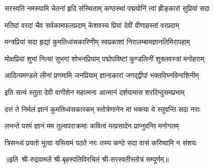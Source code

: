 
\twolineshloka
{सरस्वति नमस्यामि चेतनां हृदि संस्थिताम्}
{कण्ठस्थां पद्मयोनिं त्वां ह्रीङ्कारां सुप्रियां सदा}

\twolineshloka
{मतिदां वरदां चैव सर्वकामफलप्रदाम्}
{केशवस्य प्रियां देवीं वीणाहस्तां वरप्रदाम्}

\twolineshloka
{मन्त्रप्रियां सदा हृद्यां कुमतिध्वंसकारिणीम्}
{स्वप्रकाशां निरालम्बामज्ञानतिमिरापहाम्}

\twolineshloka
{मोक्षप्रियां शुभां नित्यां सुभगां शोभनप्रियाम्}
{पद्मोपविष्टां कुण्डलिनीं शुक्लवस्त्रां मनोहराम्}

\twolineshloka
{आदित्यमण्डले लीनां प्रणमामि जनप्रियाम्}
{ज्ञानाकारां जगद्द्वीपां भक्तविघ्नविनाशिनीम्}

\twolineshloka
{इति सत्यं स्तुता देवी वागीशेन महात्मना}
{आत्मानं दर्शयामास शरदिन्दुसमप्रभाम्}



\twolineshloka
{दत्तं ते निर्मलं ज्ञानं कुमतिध्वंसकारकम्}
{स्तोत्रेणानेन मां भक्त्या ये स्तुवन्ति सदा नराः}

\twolineshloka
{लभन्ते परमं ज्ञानं मम तुल्यपराक्रमाः}
{कवित्वं मत्प्रसादेन प्राप्नुवन्ति मनोगतम्}

\twolineshloka
{त्रिसन्ध्यं प्रयतो भूत्वा यस्त्विमं पठते नरः}
{तस्य कण्ठे सदा वासं करिष्यामि न संशयः}

॥इति~श्री-रुद्रयामले श्री-बृहस्पतिविरचितं श्री-सरस्वतीस्तोत्रं सम्पूर्णम्॥
